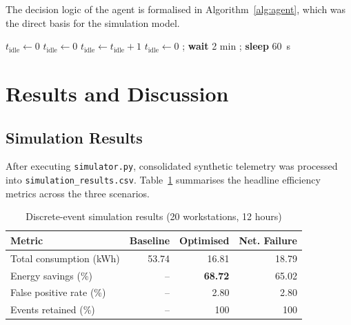 \documentclass[conference]{IEEEtran}
\begin{document}
The decision logic of the agent is formalised in Algorithm~\ref{alg:agent}, which was the direct basis for the simulation model.

\begin{algorithm}[t]
\caption{Agent inactivity decision logic (per workstation, per tick)}
\label{alg:agent}
\begin{algorithmic}[1]
\State $t_{\text{idle}} \leftarrow 0$
\Loop
    \State $t_{\text{idle}} \leftarrow 0$
  \Else
    \State $t_{\text{idle}} \leftarrow t_{\text{idle}} + 1$
  \EndIf
      \State $t_{\text{idle}} \leftarrow 0$ 
    \Else
      \State {}; \textbf{wait} 2 min
        \State {}
      \EndIf
    \EndIf
  \EndIf
  \State {}; \textbf{sleep} 60~s
\EndLoop
\end{algorithmic}
\end{algorithm}

\section{Results and Discussion}

\subsection{Simulation Results}

After executing \texttt{simulator.py}, consolidated synthetic telemetry was processed into \texttt{simulation\_results.csv}. Table~\ref{tab:results} summarises the headline efficiency metrics across the three scenarios.

\begin{table}[t]
\centering
\caption{Discrete-event simulation results (20 workstations, 12 hours)}
\label{tab:results}
\begin{tabular}{lrrr}
\toprule
\textbf{Metric} & \textbf{Baseline} & \textbf{Optimised} & \textbf{Net. Failure} \\
\midrule
Total consumption (kWh) & 53.74 & 16.81 & 18.79 \\
Energy savings (\%)     & --    & \textbf{68.72} & 65.02 \\
False positive rate (\%)& --    & 2.80  & 2.80  \\
Events retained (\%)    & --    & 100   & 100   \\
\bottomrule
\end{tabular}
\end{table}
\end{document}

